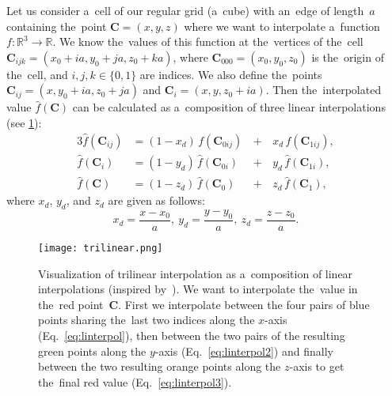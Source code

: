 				Let us consider a~cell of our regular grid (a~cube) with an~edge of length~$a$ containing the~point $\mathbf{C} = (x,y,z)$ where we want to interpolate a~function $f\colon\mathbb{R}^3\to\mathbb{R}$. We know the~values of this function at the~vertices of the~cell $\mathbf{C}_{ijk} = (x_0+ia,y_0+ja,z_0+ka)$, where $\mathbf{C}_{000} = (x_0,y_0,z_0)$ is the~origin of the~cell, and $i,j,k \in \{0,1\}$ are indices. We also define the~points $\mathbf{C}_{ij} = (x,y_0+ia,z_0+ja)$ and $\mathbf{C}_i=(x,y,z_0+ia)$. Then the~interpolated value $\widehat{f}(\mathbf{C})$ can be calculated as a~composition of three linear interpolations (see \cref{fig:trilin}):
					\begin{alignat}{3}
						\label{eq:linterpol}
						\widehat{f}(\mathbf{C}_{ij}) &= (1-x_d)\,f(\mathbf{C}_{0ij}) \,&+&\,x_d\, f(\mathbf{C}_{1ij}),\\
						\label{eq:linterpol2}
						\widehat{f}(\mathbf{C}_{i}) &= (1-y_d)\,\widehat{f}(\mathbf{C}_{0i}) &+&\,y_d\, \widehat{f}(\mathbf{C}_{1i}),\\
						\label{eq:linterpol3}
						\widehat{f}(\mathbf{C}) &= (1-z_d)\,\widehat{f}(\mathbf{C}_0) &+&\,z_d\, \widehat{f}(\mathbf{C}_1),
					\end{alignat}
				where $x_d$, $y_d$, and $z_d$ are given as follows:
					\begin{equation}
						x_d = \frac{x-x_0}{a},~y_d = \frac{y-y_0}{a},~z_d = \frac{z-z_0}{a}.
					\end{equation}
					
				\begin{figure}
					\centering
					\texttt{[image: trilinear.png]}
					\caption{Visualization of trilinear interpolation as a~composition of linear interpolations (inspired by~\cite{trilinear1}). We want to interpolate the~value in the~red point~$\mathbf{C}$. First we interpolate between the four pairs of blue points sharing the~last two indices along the $x$\protect\nobreakdash-axis (Eq.~\ref{eq:linterpol}), then between the two pairs of the resulting green points along the $y$\protect\nobreakdash-axis (Eq.~\ref{eq:linterpol2}) and finally between the two resulting orange points along the $z$\protect\nobreakdash-axis to get the~final red value (Eq.~\ref{eq:linterpol3}).}
					\label{fig:trilin}
				\end{figure}
					
